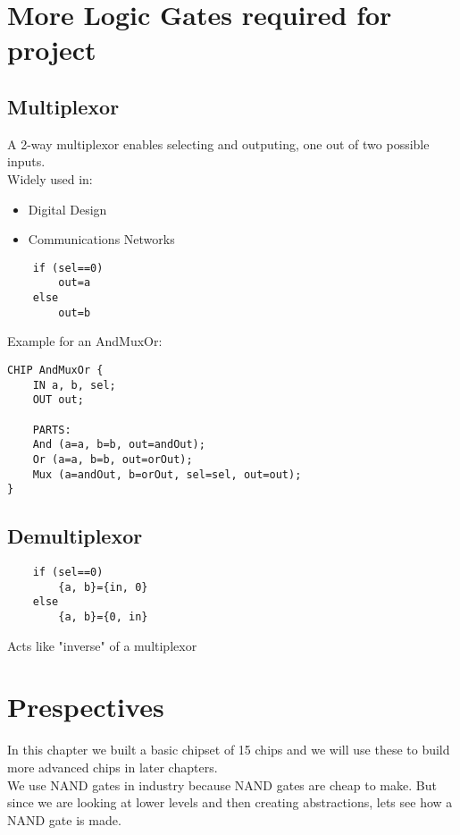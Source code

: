 \section{More Logic Gates required for project}

\subsection{Multiplexor}

A 2-way multiplexor enables selecting and outputing, one out of 
two possible inputs.\\

Widely used in:
\begin{itemize}
    \item Digital Design
    \item Communications Networks
\end{itemize}

\begin{lstlisting}
    if (sel==0)
        out=a
    else
        out=b
\end{lstlisting}

Example for an AndMuxOr:

\begin{lstlisting}
CHIP AndMuxOr {
    IN a, b, sel;
    OUT out;

    PARTS:
    And (a=a, b=b, out=andOut);
    Or (a=a, b=b, out=orOut);
    Mux (a=andOut, b=orOut, sel=sel, out=out);
}
\end{lstlisting}

\subsection{Demultiplexor}

\begin{lstlisting}
    if (sel==0)
        {a, b}={in, 0}
    else
        {a, b}={0, in}
\end{lstlisting}

Acts like "inverse" of a multiplexor

\section{Prespectives}

In this chapter we built a basic chipset of 15 chips and we will
use these to build more advanced chips in later chapters.\\

We use NAND gates in industry because NAND gates are cheap to make. But since we are looking at lower levels and then creating abstractions, lets see how a NAND gate is made.

